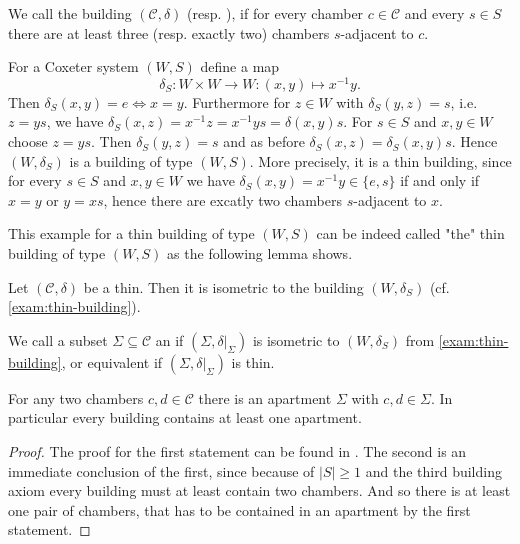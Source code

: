 \begin{defi}
	We call the building $(\mathcal{C}, \delta)$  (resp. ), if for every chamber $c \in \mathcal{C}$ and every $s \in S$ there are at least three (resp. exactly two) chambers $s$-adjacent to $c$.
\end{defi}

\begin{exam}
	For a Coxeter system $(W,S)$ define a map
	$$ \delta_S : W \times W \to W : (x,y) \mapsto x^{-1}y. $$
	Then $\delta_S(x,y) = e \iff x = y$. Furthermore for $z \in W$ with $\delta_S(y,z) = s$, i.e. $z = ys$, we have $\delta_S(x,z) = x^{-1}z = x^{-1}ys = \delta(x,y)s$. For $s \in S$ and $x,y \in W$ choose $z = ys$. Then $\delta_S(y,z) = s$ and as before $\delta_S(x,z) = \delta_S(x,y)s$. Hence $(W,\delta_S)$ is a building of type $(W,S)$. More precisely, it is a thin building, since for every $s \in S$ and $x,y \in W$ we have $\delta_S(x,y) = x^{-1}y \in \{e,s\}$ if and only if $x = y$ or $y = xs$, hence there are excatly two chambers $s$-adjacent to $x$.
\end{exam}

This example for a thin building of type $(W,S)$ can be indeed called "the" thin building of type $(W,S)$ as the following lemma shows.

\begin{lemm}
	Let $(\mathcal{C}, \delta)$ be a thin. Then it is isometric to the building $(W, \delta_S)$ (cf. \ref{exam:thin-building}).
\end{lemm}

\begin{defi}
	We call a subset $\Sigma \subseteq \mathcal{C}$ an  if $(\Sigma, \delta|_\Sigma)$ is isometric to $(W,\delta_S)$ from \ref{exam:thin-building}, or equivalent if $(\Sigma, \delta|_\Sigma)$ is thin.
\end{defi}

\begin{theo}
	For any two chambers $c,d \in \mathcal{C}$ there is an apartment $\Sigma$ with $c,d \in \Sigma$. In particular every building contains at least one apartment.

	\begin{proof}
		The proof for the first statement can be found in \cite[Theorem 11.2.5]{buekenhout:diagram-geometry}. The second is an immediate conclusion of the first, since because of $|S| \geq 1$ and the third building axiom every building must at least contain two chambers. And so there is at least one pair of chambers, that has to be contained in an apartment by the first statement.
	\end{proof}
\end{theo}

